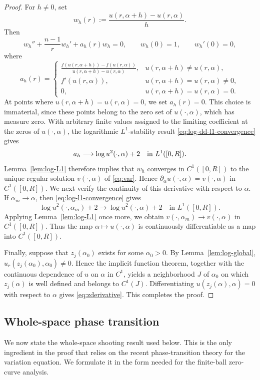 \documentclass[11pt]{article}
\begin{document}
\begin{proof}
For $h\ne0$, set
\[
 w_h(r):=\frac{u(r,\alpha+h)-u(r,\alpha)}{h}.
\]
Then
\[
 w_h''+\frac{n-1}{r}w_h'+a_h(r)w_h=0,\qquad w_h(0)=1,\qquad w_h'(0)=0,
\]
where
\[
a_h(r)=
\begin{cases}
\displaystyle
\frac{f(u(r,\alpha+h))-f(u(r,\alpha))}
     {u(r,\alpha+h)-u(r,\alpha)},
& u(r,\alpha+h)\neq u(r,\alpha),\\[1ex]
f'(u(r,\alpha)),
& u(r,\alpha+h)=u(r,\alpha)\neq0,\\
0,
& u(r,\alpha+h)=u(r,\alpha)=0.
\end{cases}
\]
At points where $u(r,\alpha+h)=u(r,\alpha)=0$, we set $a_h(r)=0$. This choice is immaterial, since these points belong to the zero set of $u(\cdot,\alpha)$, which has measure zero. With arbitrary finite values assigned to the limiting coefficient at the zeros of $u(\cdot,\alpha)$, the logarithmic $L^1$-stability result \eqref{eq:log-dd-l1-convergence} gives
\[
 a_h\longrightarrow \log u^2(\cdot,\alpha)+2\quad\hbox{in }L^1([0,R]).
\]
Lemma~\ref{lem:log-L1} therefore implies that $w_h$ converges in $C^1([0,R])$ to the unique regular solution $v(\cdot,\alpha)$ of \eqref{eq:var}. Hence $\partial_\alpha u(\cdot,\alpha)=v(\cdot,\alpha)$ in $C^1([0,R])$. We next verify the continuity of this derivative with respect to $\alpha$. If $\alpha_m\to\alpha$, then \eqref{eq:log-l1-convergence} gives
\[
\log u^2(\cdot,\alpha_m)+2
\longrightarrow
\log u^2(\cdot,\alpha)+2
\quad\text{in }L^1([0,R]).
\]
Applying Lemma~\ref{lem:log-L1} once more, we obtain
$v(\cdot,\alpha_m)\rightarrow v(\cdot,\alpha)$
in $C^1([0,R])$.
Thus the map $\alpha\mapsto u(\cdot,\alpha)$ is continuously differentiable as a map into $C^1([0,R])$.


Finally, suppose that $z_j(\alpha_0)$ exists for some $\alpha_0>0$. By Lemma~\ref{lem:log-global},
$u_r(z_j(\alpha_0),\alpha_0)\neq0$.
Hence the implicit function theorem, together with the {continuous dependence of $u$ on $\alpha$ in $C^1$}, yields a neighborhood $J$ of $\alpha_0$ on which $z_j(\alpha)$ is well defined and belongs to $C^1(J)$. Differentiating $u(z_j(\alpha),\alpha)=0$ with respect to $\alpha$ gives \eqref{eq:zderivative}.
This completes the proof.
\end{proof}

\subsection{Whole-space phase transition}
We now state the whole-space shooting result used below. This is the only ingredient in the proof that relies on the recent phase-transition theory for the variation equation. We formulate it in the form needed for the finite-ball zero-curve analysis.
\end{document}
